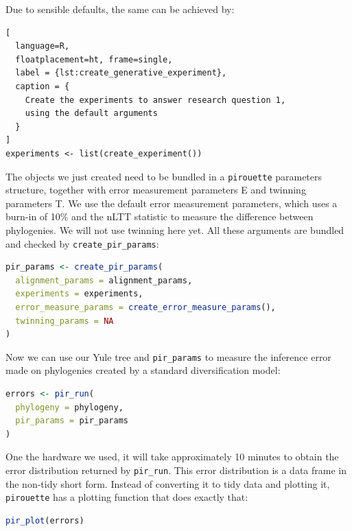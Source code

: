 \documentclass{article}
\begin{document}
Due to sensible defaults, the same can be achieved by:

\begin{lstlisting}[
  language=R, 
  floatplacement=ht, frame=single,
  label = {lst:create_generative_experiment},
  caption = {
    Create the experiments to answer research question 1, 
    using the default arguments
  }
]
experiments <- list(create_experiment())
\end{lstlisting}

The objects we just created need to be bundled
in a \verb;pirouette; parameters structure,
together with error measurement parameters E and
twinning parameters T. We use the default error measurement
parameters, which uses a burn-in of 10\% and the nLTT statistic to
measure the difference between phylogenies. We will not use twinning
here yet.  
All these arguments are bundled
and checked by \verb;create_pir_params;:

\begin{lstlisting}[language=R, floatplacement=ht, frame=single]
pir_params <- create_pir_params(
  alignment_params = alignment_params,
  experiments = experiments,
  error_measure_params = create_error_measure_params(),
  twinning_params = NA
)
\end{lstlisting}

Now we can use our Yule tree and \verb;pir_params; to measure 
the inference error made on phylogenies
created by a standard diversification model:

\begin{lstlisting}[language=R, floatplacement=ht, frame=single]
errors <- pir_run(
  phylogeny = phylogeny,
  pir_params = pir_params
)
\end{lstlisting}

One the hardware we used, it will take approximately 10 minutes
to obtain the error distribution returned by \verb;pir_run;.
This error distribution is a data frame in the non-tidy short form.
Instead of converting it to tidy data and plotting it,
\verb;pirouette; has a plotting function that does exactly that:

\begin{lstlisting}[language=R, floatplacement=ht, frame=single]
pir_plot(errors)
\end{lstlisting}
\end{document}
